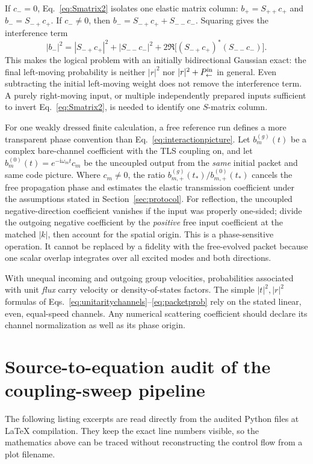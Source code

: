 \documentclass[11pt,a4paper]{article}
\newcommand{\ii}{\mathrm i}
\begin{document}
If $c_-=0$, Eq.~\eqref{eq:Smatrix2} isolates one elastic matrix column: $b_+=S_{++}c_+$ and $b_-=S_{-+}c_+$. If $c_-\ne0$, then $b_-=S_{-+}c_++S_{--}c_-$. Squaring gives the interference term
\begin{equation}
 |b_-|^2=|S_{-+}c_+|^2+|S_{--}c_-|^2
 +2\Re\bigl[(S_{-+}c_+)^*(S_{--}c_-)\bigr].
 \label{eq:initialleftinterference}
\end{equation}
This makes the logical problem with an initially bidirectional Gaussian exact: the final left-moving probability is neither $|r|^2$ nor $|r|^2+P_{\leftarrow}^{\rm in}$ in general. Even subtracting the initial left-moving weight does not remove the interference term. A purely right-moving input, or multiple independently prepared inputs sufficient to invert Eq.~\eqref{eq:Smatrix2}, is needed to identify one $S$-matrix column.

For one weakly dressed finite calculation, a free reference run defines a more transparent phase convention than Eq.~\eqref{eq:interactionpicture}. Let $b_m^{(g)}(t)$ be a complex bare-channel coefficient with the TLS coupling on, and let $b_m^{(0)}(t)=e^{-\ii\omega_mt}c_m$ be the uncoupled output from the \emph{same} initial packet and same code picture. Where $c_m\ne0$, the ratio $b_{m,+}^{(g)}(t_*)/b_{m,+}^{(0)}(t_*)$ cancels the free propagation phase and estimates the elastic transmission coefficient under the assumptions stated in Section~\ref{sec:protocol}. For reflection, the uncoupled negative-direction coefficient vanishes if the input was properly one-sided; divide the outgoing negative coefficient by the \emph{positive} free input coefficient at the matched $|k|$, then account for the spatial origin. This is a phase-sensitive operation. It cannot be replaced by a fidelity with the free-evolved packet because one scalar overlap integrates over all excited modes and both directions.

With unequal incoming and outgoing group velocities, probabilities associated with unit \emph{flux} carry velocity or density-of-states factors. The simple $|t|^2,|r|^2$ formulas of Eqs.~\eqref{eq:unitaritychannels}--\eqref{eq:packetprob} rely on the stated linear, even, equal-speed channels. Any numerical scattering coefficient should declare its channel normalization as well as its phase origin.

\section{Source-to-equation audit of the coupling-sweep pipeline}
\label{app:pipeline}
The following listing excerpts are read directly from the audited Python files at LaTeX compilation. They keep the exact line numbers visible, so the mathematics above can be traced without reconstructing the control flow from a plot filename.
\end{document}
